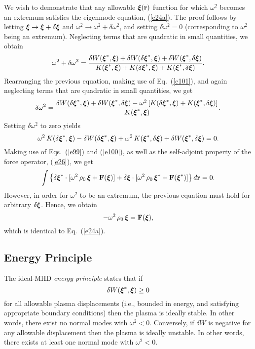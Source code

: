 \documentclass[12pt,prb,aps,notitlepage]{revtex4-1}
\newcommand{\bxi}{\mbox{\boldmath$\xi$}}
\begin{document}
We wish to demonstrate that any allowable $\bxi({\bf r})$ function for which $\omega^2$ becomes an extremum satisfies the eigenmode equation, (\ref{e24a}). The proof follows by letting $\bxi\rightarrow \bxi + \delta\bxi$ and $\omega^2\rightarrow \omega^2+\delta\omega^2$,
and setting $\delta\omega^2=0$ (corresponding to $\omega^2$ being an extremum). 
Neglecting terms that are quadratic in small quantities, we obtain
\begin{equation}
\omega^2+\delta\omega^2= \frac{\delta W(\bxi^\ast,\bxi)+\delta W(\delta\bxi^\ast,\bxi)+\delta W(\bxi^\ast,\delta\bxi)}
{K(\bxi^\ast,\bxi)+K(\delta\bxi^\ast,\bxi)+K(\bxi^\ast,\delta\bxi)}.
\end{equation}
Rearranging the previous equation, making use of Eq.~(\ref{e101}), and again neglecting terms that are quadratic in small quantities,
we get
\begin{equation}
\delta \omega^2 = \frac{\delta W(\delta\bxi^\ast,\bxi)+\delta W(\bxi^\ast,\delta\bxi)-\omega^2\,[K(\delta\bxi^\ast,\bxi)+K(\bxi^\ast,\delta\bxi)]}
{K(\bxi^\ast,\bxi)}. 
\end{equation}
Setting $\delta\omega^2$ to zero yields
\begin{equation}
\omega^2\,K(\delta\bxi^\ast,\bxi)-\delta W(\delta\bxi^\ast,\bxi) + \omega^2\,K(\bxi^\ast,\delta\bxi) + \delta W(\bxi^\ast,\delta\bxi)=0.
\end{equation}
Making use of Eqs.~(\ref{e99}) and (\ref{e100}), as well as the self-adjoint property of the force operator, (\ref{e26}), we get
\begin{equation}
\int \left\{\delta\bxi^\ast\cdot[\omega^2\,\rho_0\,\bxi+{\bf F}(\bxi)]+ \delta\bxi\cdot[\omega^2\,\rho_0\,\bxi^\ast + {\bf F}(\bxi^\ast)]\right\}d{\bf r} = 0.
\end{equation}
However, in order for $\omega^2$ to be an extremum, the previous equation must hold for arbitrary $\delta\bxi$. Hence, 
we obtain
\begin{equation}
-\omega^2\,\rho_0\,\bxi = {\bf F}(\bxi),
\end{equation}
which is identical to Eq.~(\ref{e24a}). 

\subsection{Energy Principle}
The ideal-MHD {\em energy principle}\/ states that if
\begin{equation}
\delta W(\bxi^\ast,\bxi) \geq 0
\end{equation}
for all allowable plasma displacements (i.e., bounded in energy, and satisfying appropriate boundary conditions) then
the plasma is ideally stable. In other words, there exist no normal modes with $\omega^2<0$. Conversely, if $\delta W$ is negative
for any allowable displacement then the plasma is ideally unstable. In other words, there exists at least one normal mode with $\omega^2<0$. 
\end{document}
